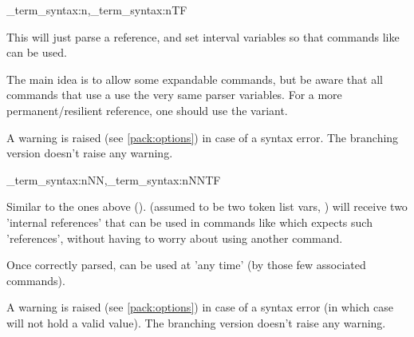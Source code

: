 \documentclass[10pt]{article}
\begin{document}
\begin{codedescribe}[code,new=2023/05/20]{\starray_term_syntax:n,\starray_term_syntax:nTF}
\begin{codesyntax}%
\end{codesyntax}
This will just parse  a  reference, and set interval variables so that commands like  can be used.
\end{codedescribe}
\begin{tsremark}
The main idea is to allow some expandable commands, but be aware that all \tsobj{\starray_} commands that use a  use the very same parser variables. For a more permanent/resilient  reference, one should use the  variant.
\end{tsremark}
\begin{tsremark}
A warning is raised (see \ref{pack:options}) in case of a  syntax error. The branching version doesn't raise any warning.
\end{tsremark}

\begin{codedescribe}[code,new=2023/11/28]{\starray_term_syntax:nNN,\starray_term_syntax:nNNTF}
\begin{codesyntax}%
\end{codesyntax}
Similar to the ones above ().  (assumed to be two token list vars, ) will receive two 'internal references' that can be used in commands like  which expects such 'references', without having to worry about using another \tsobj{\starray_} command.
\end{codedescribe}
\begin{tsremark}
Once correctly parsed,  can be used at 'any time' (by those few  associated commands).\end{tsremark}
\begin{tsremark}
A warning is raised (see \ref{pack:options}) in case of a  syntax error (in which case  will not hold a valid value). The branching version doesn't raise any warning.
\end{tsremark}
\end{document}
